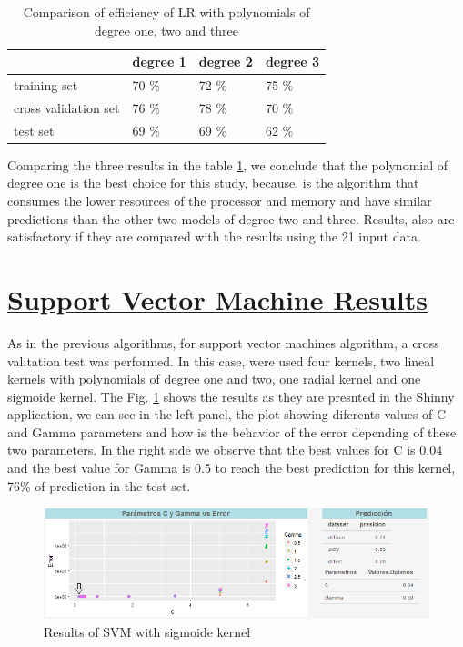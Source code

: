 \documentclass[]{book}
\begin{document}
\begin{table}[ht]
\centering
\caption{Comparison of efficiency of LR with polynomials of degree one, two and three}
\label{tab:results-of-efficiency-logistic-regression}
\begin{tabular}{llll}
\hline
                     & degree 1 & degree 2 & degree 3 \\ \hline
training set         & 70 \%    & 72 \%    & 75 \%    \\
cross validation set & 76 \%    & 78 \%    & 70 \%    \\
test set             & 69 \%    & 69 \%    & 62 \%    \\ \hline
\end{tabular}
\end{table}

Comparing the three results in the table
\ref{tab:results-of-efficiency-logistic-regression}, we conclude that
the polynomial of degree one is the best choice for this study, because,
is the algorithm that consumes the lower resources of the processor and
memory and have similar predictions than the other two models of degree
two and three. Results, also are satisfactory if they are compared with
the results using the 21 input data.

\section{\texorpdfstring{\protect\hyperlink{SVM-results}{Support Vector
Machine
Results}}{Support Vector Machine Results}}\label{support-vector-machine-results}

As in the previous algorithms, for support vector machines algorithm, a
cross valitation test was performed. In this case, were used four
kernels, two lineal kernels with polynomials of degree one and two, one
radial kernel and one sigmoide kernel. The Fig.
\ref{fig:SVM-sigmoide-2-flecha} shows the results as they are presnted
in the Shinny application, we can see in the left panel, the plot
showing diferents values of C and Gamma parameters and how is the
behavior of the error depending of these two parameters. In the right
side we observe that the best values for C is 0.04 and the best value
for Gamma is 0.5 to reach the best prediction for this kernel, 76\% of
prediction in the test set.

\begin{figure}[H]

{\centering \includegraphics[width=0.8\linewidth]{images/SVM-sigmoide-2-flecha} 

}

\caption{Results of SVM with sigmoide kernel}\label{fig:SVM-sigmoide-2-flecha}
\end{figure}
\end{document}

